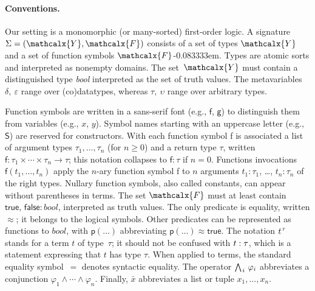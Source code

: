 \documentclass[smallcondensed,draft]{svjour3}
\newcommand\typ[1]{^{\vthinspace #1}}
\newcommand\Sig{\mathrm{\Sigma}}
\newcommand\const[1]{\textsf{#1}}
\newcommand\ty[1]{\textit{#1}}
\newcommand{\teq}{\approx}
\newcommand\Types{\mathcalx{Y}}
\newcommand\Funcs{\mathcalx{F}}
\newcommand\vthinspace{\kern+0.083333em}
\newcommand\negvthinspace{\kern-0.083333em}
\begin{document}
\paragraph{Conventions.}
Our setting is a monomorphic (or many-sorted) first-order logic.
A signature $\Sig = (\Types, \Funcs)$ consists of a set of types $\Types$ and a
set of function symbols $\Funcs$\negvthinspace. Types are atomic sorts and interpreted as
nonempty domains. The set~$\Types$ must contain a
distinguished type \ty{bool} interpreted as the set of truth
values. %
The metavariables $\delta,\:\varepsilon$ range over (co)datatypes,
whereas $\tau,\:\upsilon$ range over arbitrary types.

Function symbols are written in a sans-serif font (e.g., $\const{f}$, $\const{g}$) to
distinguish them from variables (e.g., $x$, $y$).
Symbol names starting with an uppercase letter (e.g.,
$\const{S}$) are reserved for constructors. With each function symbol \const{f}
is associated a list of argument types $\tau_1,\ldots,\tau_n$ (for $n \ge 0$)
and a return type $\tau$, written
$\const{f} : \tau_1 \times \cdots \times \tau_n \to \tau$;
this notation collapses to $\const{f} : \tau$ if $n = 0$.
%
Functions invocations $\const{f}(t_1,\ldots,t_n)$
apply the $n$-ary function symbol
\const{f} to $n$ %
arguments $t_1 \mathbin{:} \tau_1$, \ldots, $t_n \mathbin{:}
\tau_n$ of the right types.
Nullary function symbols, also called constants, can appear without
parentheses in terms.
The set $\Funcs$ must at least contain
$\const{true},\, \const{false} : \ty{bool}$, interpreted as truth values.
The only predicate is equality, written $\teq$;
it belongs to the logical symbols.
Other predicates can be represented as functions to $\ty{bool}$,
with $\const{p}(\ldots)$ abbreviating $\const{p}(\ldots) \teq \const{true}$.
The notation $t\typ{\tau}$ stands for a term $t$ of type~$\tau$;
it should not be confused with $t :\nobreak \tau$,
which is a statement expressing that $t$ has type $\tau$.
When applied to terms, the standard equality symbol~$=$ denotes syntactic equality.
The operator $\bigwedge_{\vthinspace i}\, \varphi_i$ abbreviates a conjunction
$\varphi_1 \mathrel\land \cdots \mathrel\land \varphi_n$.
Finally, $\bar x$ abbreviates a list or tuple $x_1,\ldots,x_n$.

\end{document}
